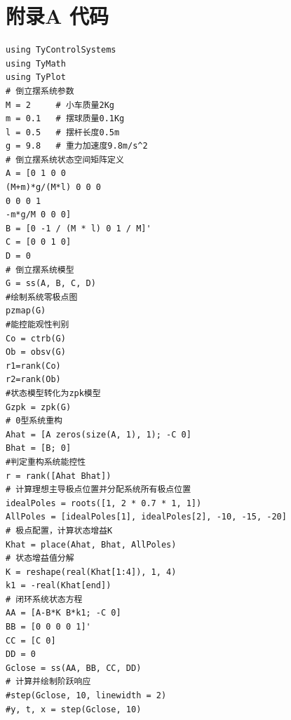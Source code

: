 \documentclass{ctexart}
\begin{document}
		
	
	\newpage
	\appendix
	\section*{附录A \quad 代码}
		\begin{lstlisting}[language={}]
using TyControlSystems
using TyMath
using TyPlot
# 倒立摆系统参数
M = 2     # 小车质量2Kg
m = 0.1   # 摆球质量0.1Kg
l = 0.5   # 摆杆长度0.5m
g = 9.8   # 重力加速度9.8m/s^2
# 倒立摆系统状态空间矩阵定义
A = [0 1 0 0
(M+m)*g/(M*l) 0 0 0
0 0 0 1
-m*g/M 0 0 0]
B = [0 -1 / (M * l) 0 1 / M]'
C = [0 0 1 0]
D = 0
# 倒立摆系统模型
G = ss(A, B, C, D)
#绘制系统零极点图
pzmap(G)
#能控能观性判别
Co = ctrb(G)
Ob = obsv(G)
r1=rank(Co)
r2=rank(Ob)
#状态模型转化为zpk模型
Gzpk = zpk(G)
# 0型系统重构
Ahat = [A zeros(size(A, 1), 1); -C 0]
Bhat = [B; 0]
#判定重构系统能控性
r = rank([Ahat Bhat])
# 计算理想主导极点位置并分配系统所有极点位置
idealPoles = roots([1, 2 * 0.7 * 1, 1])
AllPoles = [idealPoles[1], idealPoles[2], -10, -15, -20]
# 极点配置，计算状态增益K
Khat = place(Ahat, Bhat, AllPoles)
# 状态增益值分解
K = reshape(real(Khat[1:4]), 1, 4)
k1 = -real(Khat[end])
# 闭环系统状态方程
AA = [A-B*K B*k1; -C 0]
BB = [0 0 0 0 1]'
CC = [C 0]
DD = 0
Gclose = ss(AA, BB, CC, DD)
# 计算并绘制阶跃响应
#step(Gclose, 10, linewidth = 2) 
#y, t, x = step(Gclose, 10)

		\end{lstlisting}
	
\end{document}
